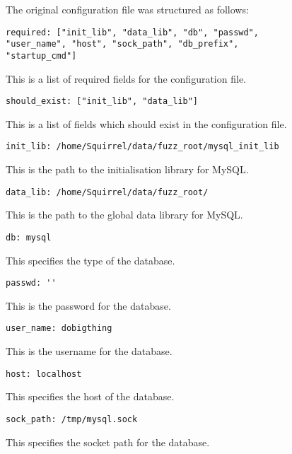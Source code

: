 \documentclass[sigconf]{acmart}
\begin{document}
The original configuration file was structured as follows:

\begin{verbatim}
required: ["init_lib", "data_lib", "db", "passwd",
"user_name", "host", "sock_path", "db_prefix",
"startup_cmd"]
\end{verbatim}

This is a list of required fields for the configuration file.

\begin{verbatim}
should_exist: ["init_lib", "data_lib"]
\end{verbatim}

This is a list of fields which should exist in the configuration file.

\begin{verbatim}
init_lib: /home/Squirrel/data/fuzz_root/mysql_init_lib
\end{verbatim}

This is the path to the initialisation library for MySQL.

\begin{verbatim}
data_lib: /home/Squirrel/data/fuzz_root/
\end{verbatim}

This is the path to the global data library for MySQL.

\begin{verbatim}
db: mysql
\end{verbatim}

This specifies the type of the database.

\begin{verbatim}
passwd: ''
\end{verbatim}

This is the password for the database.

\begin{verbatim}
user_name: dobigthing
\end{verbatim}

This is the username for the database.

\begin{verbatim}
host: localhost
\end{verbatim}

This specifies the host of the database.

\begin{verbatim}
sock_path: /tmp/mysql.sock
\end{verbatim}

This specifies the socket path for the database.
\end{document}
